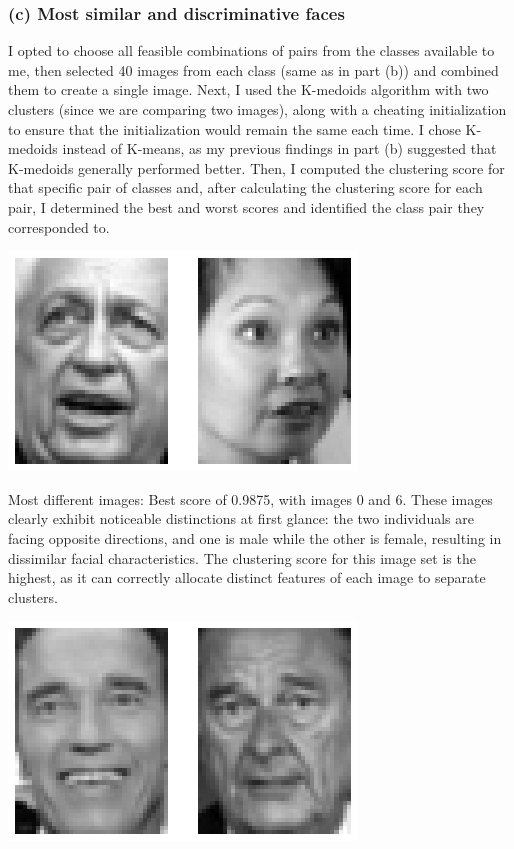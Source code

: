 \documentclass[11pt]{article}
\newcommand{\sol}[1]{{\bf{\color{magenta}{{Solution:}}}}}
\begin{document}
\subsubsection{(c) Most similar and discriminative faces}
\sol x

I opted to choose all feasible combinations of pairs from the classes available to me, then selected 40 images from each class (same as in part (b)) and combined them to create a single image. Next, I used the K-medoids algorithm with two clusters (since we are comparing two images), along with a cheating initialization to ensure that the initialization would remain the same each time. I chose K-medoids instead of K-means, as my previous findings in part (b) suggested that K-medoids generally performed better. Then, I computed the clustering score for that specific pair of classes and, after calculating the clustering score for each pair, I determined the best and worst scores and identified the class pair they corresponded to.

\begin{center}
    \includegraphics[scale=0.6]{3c-1.png}
\end{center}

Most different images: Best score of 0.9875, with images 0 and 6. These images clearly exhibit noticeable distinctions at first glance: the two individuals are facing opposite directions, and one is male while the other is female, resulting in dissimilar facial characteristics. The clustering score for this image set is the highest, as it can correctly allocate distinct features of each image to separate clusters.


\begin{center}
    \includegraphics[scale=0.6]{3c-2.png}
\end{center}
\end{document}
